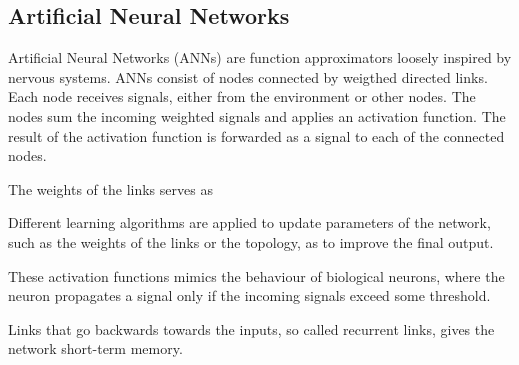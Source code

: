 \subsection{Artificial Neural Networks}
Artificial Neural Networks (ANNs) are function approximators loosely inspired by nervous systems.
ANNs consist of nodes connected by weigthed directed links. Each node receives signals, either from
the environment or other nodes. The nodes sum the incoming weighted signals and applies an activation
function. The result of the activation function is forwarded as a signal to each of the connected nodes.

The weights of the links serves as

\label{Neural networks figure}



Different learning algorithms are applied to update parameters of the network, such as the weights of the
links or the topology, as to improve the final output.

These activation functions mimics the behaviour of biological neurons, where the neuron propagates
a signal only if the incoming signals exceed some threshold.


Links that go backwards towards the inputs, so called recurrent links, gives the network short-term memory.

